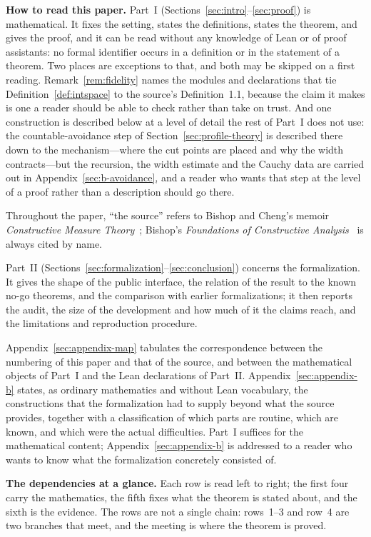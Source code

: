 \documentclass[11pt]{article}
\theoremstyle{definition}
\theoremstyle{remark}
\begin{document}
\bigskip
\noindent\textbf{How to read this paper.}  Part~I (Sections~\ref{sec:intro}--\ref{sec:proof}) is mathematical.  It fixes the setting, states the definitions, states the theorem, and gives the proof, and it can be read without any knowledge of Lean or of proof assistants: no formal identifier occurs in a definition or in the statement of a theorem.  Two places are exceptions to that, and both may be skipped on a first reading.  Remark~\ref{rem:fidelity} names the modules and declarations that tie Definition~\ref{def:intspace} to the source's Definition~1.1, because the claim it makes is one a reader should be able to check rather than take on trust.  And one construction is described below at a level of detail the rest of Part~I does not use: the countable-avoidance step of Section~\ref{sec:profile-theory} is described there down to the mechanism---where the cut points are placed and why the width contracts---but the recursion, the width estimate and the Cauchy data are carried out in Appendix~\ref{sec:b-avoidance}, and a reader who wants that step at the level of a proof rather than a description should go there.  

Throughout the paper, ``the source'' refers to Bishop and Cheng's memoir \emph{Constructive Measure Theory}~\cite{bishop-cheng-1972}; Bishop's \emph{Foundations of Constructive Analysis}~\cite{bishop-1967} is always cited by name.  

Part~II (Sections~\ref{sec:formalization}--\ref{sec:conclusion}) concerns the formalization.  It gives the shape of the public interface, the relation of the result to the known no-go theorems, and the comparison with earlier formalizations; it then reports the audit, the size of the development and how much of it the claims reach, and the limitations and reproduction procedure.  

Appendix~\ref{sec:appendix-map} tabulates the correspondence between the numbering of this paper and that of the source, and between the mathematical objects of Part~I and the Lean declarations of Part~II.  Appendix~\ref{sec:appendix-b} states, as ordinary mathematics and without Lean vocabulary, the constructions that the formalization had to supply beyond what the source provides, together with a classification of which parts are routine, which are known, and which were the actual difficulties.  Part~I suffices for the mathematical content; Appendix~\ref{sec:appendix-b} is addressed to a reader who wants to know what the formalization concretely consisted of.

\bigskip
\noindent\textbf{The dependencies at a glance.}  Each row is read left to right; the
first four carry the mathematics, the fifth fixes what the theorem is stated about,
and the sixth is the evidence.  The rows are not a single chain: rows~1--3 and row~4
are two branches that meet, and the meeting is where the theorem is proved.
\end{document}
